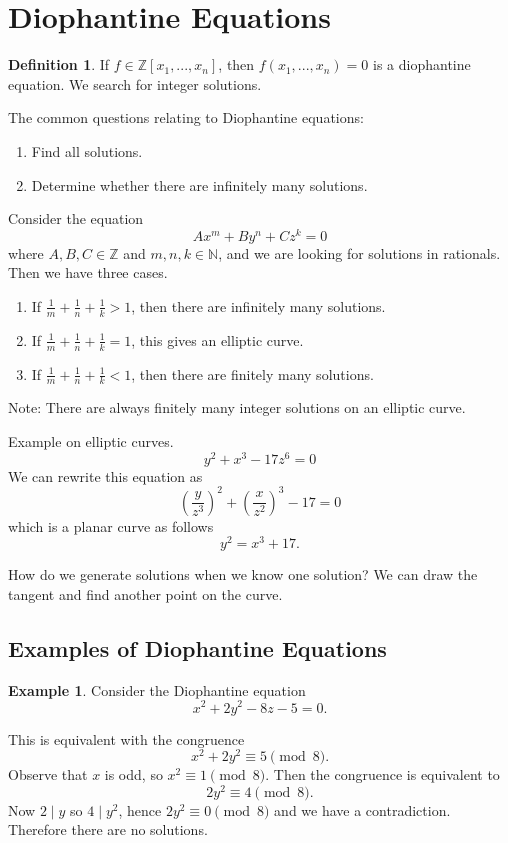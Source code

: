 \documentclass[11pt]{article}
\theoremstyle{definition}
\newtheorem{defn}{Definition}[section]
\newtheorem{example}{Example}[section]
\newcommand{\ZZ}{\mathbb{Z}}
\newcommand{\NN}{\mathbb{N}}
\begin{document}

\section{Diophantine Equations}

\begin{defn}
	If $f\in\ZZ[x_1,...,x_n]$, then $f(x_1, ..., x_n) = 0$ is a diophantine equation.
	We search for integer solutions.
\end{defn}

The common questions relating to Diophantine equations:
\begin{enumerate}
	\item Find all solutions.
	\item Determine whether there are infinitely many solutions.
\end{enumerate}

Consider the equation 
$$ A x^m + B y^n + C z^k = 0 $$
where $A,B,C\in\ZZ$ and $m,n,k\in\NN$, and we are looking for solutions in rationals. 
Then we have three cases.
\begin{enumerate}
	\item If $\frac{1}{m}+\frac{1}{n}+\frac{1}{k} > 1$, then there are infinitely many solutions.
	\item If $\frac{1}{m}+\frac{1}{n}+\frac{1}{k} = 1$, this gives an elliptic curve.
	\item If $\frac{1}{m}+\frac{1}{n}+\frac{1}{k} < 1$, then there are finitely many solutions.
\end{enumerate}

Note: There are always finitely many integer solutions on an elliptic curve. 

Example on elliptic curves. 
$$ y^2 + x^3 - 17z^6 = 0 $$
We can rewrite this equation as 
$$ \left( \frac{y}{z^3} \right)^2 + \left( \frac{x}{z^2} \right)^3 - 17 = 0 $$
which is a planar curve as follows
$$ y^2 = x^3 + 17 . $$

How do we generate solutions when we know one solution?
We can draw the tangent and find another point on the curve.


\subsection{Examples of Diophantine Equations}
\begin{example}
	Consider the Diophantine equation
	$$ x^2 + 2y^2 - 8z - 5 = 0 . $$
\end{example}
\proof
	This is equivalent with the congruence 
	$$ x^2 + 2y^2 \equiv 5 \pmod{8} . $$
	Observe that $x$ is odd, so $x^2 \equiv 1 \pmod{8}$. 
	Then the congruence is equivalent to 
	$$ 2y^2 \equiv 4 \pmod{8} . $$
	Now $2\mid y$ so $4\mid y^2$, hence $2y^2 \equiv 0 \pmod{8}$ and we have a contradiction.
	Therefore there are no solutions. 
\qedhere
\end{document}
